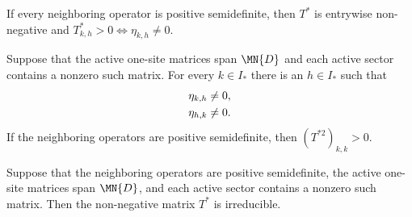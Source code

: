 \begin{lemma}%
    \label{thm:mpdo_active_trace_matrix_positive_entries}
    \leanok
    If every neighboring operator is positive semidefinite, then $T^*$ is
    entrywise non-negative and
    $T^*_{k,h}>0\Longleftrightarrow\eta_{k,h}\ne0$.
\end{lemma}

\begin{lemma}%
    \label{thm:mpdo_active_sector_two_step_return}
    \leanok
    Suppose that the active one-site matrices span $\MN{D}$ and each active
    sector contains a nonzero such matrix. For every $k\in I_*$ there is an
    $h\in I_*$ such that
    \begin{align}
        \eta_{k,h} & \ne0,
        \notag             \\
        \eta_{h,k} & \ne0.
        \notag
    \end{align}
    If the neighboring operators are positive semidefinite, then
    $(T^{*2})_{k,k}>0$.
\end{lemma}

\begin{lemma}%
    \label{thm:mpdo_active_trace_matrix_irreducible}
    \leanok
    Suppose that the neighboring operators are positive semidefinite, the
    active one-site matrices span $\MN{D}$, and each active sector contains a
    nonzero such matrix. Then the non-negative matrix $T^*$ is irreducible.
\end{lemma}

